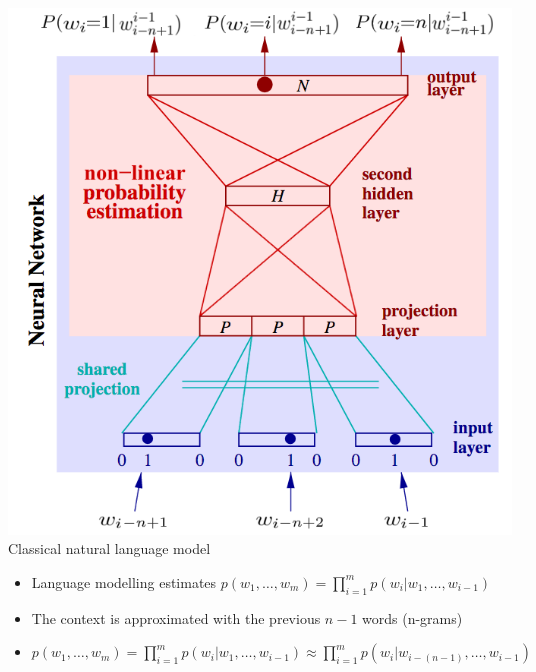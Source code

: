\documentclass[11pt, a4paper, landscape]{article}
\begin{document}
\vfill
\begin{minipage}[b]{.4\linewidth}
  \begin{center}
    \includegraphics[width=\linewidth]{../article/img/classic_nnlm}
    Classical natural language model
  \end{center}
\end{minipage}
\begin{minipage}[b]{.6\linewidth}
\vfill
\begin{itemize}
\item Language modelling estimates $p(w_1,\dots,w_m) = \prod_{i=1}^{m} p(w_i | w_1,\dots,w_{i-1})$
\item The context is approximated with the previous $n - 1$ words (n-grams)
\item $p(w_1,\dots,w_m) = \prod_{i=1}^{m} p(w_i | w_1,\dots,w_{i-1}) \approx \prod_{i=1}^{m} p(w_i | w_{i-(n-1)},\dots,w_{i-1})$
\end{itemize}
\vfill
\end{minipage}
\vfill

\NewPage{}
\end{document}
